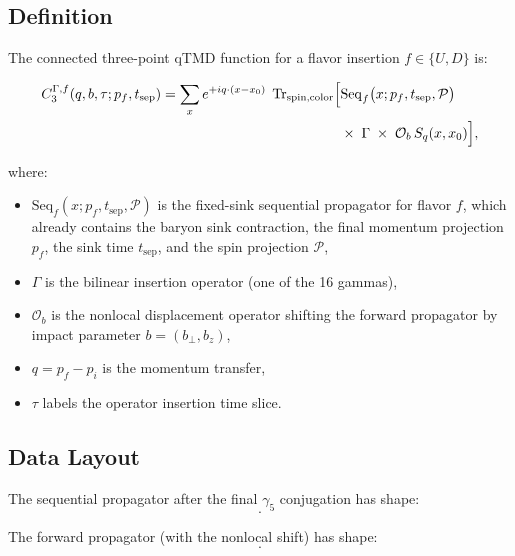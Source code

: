 \documentclass[11pt,a4paper]{article}
\newcommand{\xvec}{x}
\newcommand{\xzerovec}{x_0}
\begin{document}
\subsection{Definition}

The connected three-point qTMD function for a flavor insertion $f \in \{U, D\}$ is:

\begin{align}
  C_3^{\Gamma, f}(q, b, \tau; p_f, t_{\text{sep}}) =
    \sum_{\xvec} e^{+i q\cdot (\xvec - \xzerovec)} \;
    \operatorname{Tr}_{\text{spin,color}}\Bigl[
      &\mathrm{Seq}_f\bigl(\xvec; p_f, t_{\text{sep}}, \mathcal{P}\bigr) \notag \\
      &\times\; \Gamma \;
      \times\; \mathcal{O}_b\, S_q(\xvec, \xzerovec)
    \Bigr],
  \label{eq:C3_def}
\end{align}

where:
\begin{itemize}
  \item $\mathrm{Seq}_f(\xvec; p_f, t_{\text{sep}}, \mathcal{P})$ is the
    fixed-sink sequential propagator for flavor $f$, which already contains the
    baryon sink contraction, the final momentum projection $p_f$, the sink time
    $t_{\text{sep}}$, and the spin projection $\mathcal{P}$,
  \item $\Gamma$ is the bilinear insertion operator (one of the 16 gammas),
  \item $\mathcal{O}_b$ is the nonlocal displacement operator shifting the forward
    propagator by impact parameter $b = (b_\perp, b_z)$,
  \item $q = p_f - p_i$ is the momentum transfer,
  \item $\tau$ labels the operator insertion time slice.
\end{itemize}

\subsection{Data Layout}

The sequential propagator after the final $\gamma_5$ conjugation has shape:
\begin{equation}
  [\text{polarization},\, \omega,\, t,\, z,\, y,\, x_{cb},\,
    \mathrm{spin}_a,\, \mathrm{spin}_b,\, \mathrm{color}_a,\, \mathrm{color}_b].
\end{equation}

The forward propagator (with the nonlocal shift) has shape:
\begin{equation}
  [\omega,\, t,\, z,\, y,\, x_{cb},\,
    \mathrm{spin}_a,\, \mathrm{spin}_b,\, \mathrm{color}_a,\, \mathrm{color}_b].
\end{equation}
\end{document}
